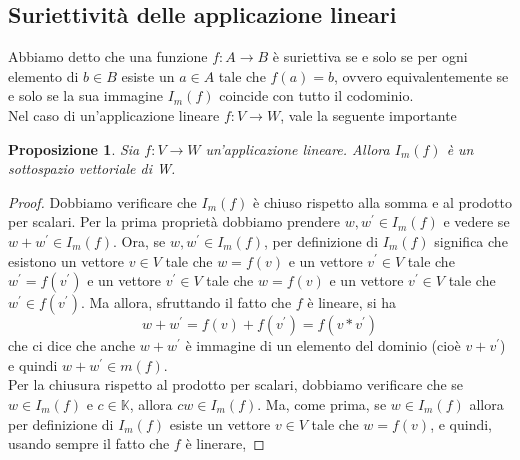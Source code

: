 \documentclass{book}
\newtheorem{proposizione}{Proposizione}
\begin{document}
\subsection{Suriettività delle applicazione lineari}
Abbiamo detto che una funzione $f: A\to B$ è suriettiva se e solo se per ogni elemento di
$b\in B$ esiste un $a\in A$ tale che $f(a)=b$, ovvero equivalentemente se e solo se la sua
immagine $I_m(f)$ coincide con tutto il codominio.\\
Nel caso di un'applicazione lineare $f:V\to W$, vale la seguente importante
\begin{proposizione}
  Sia $f: V\to W$ un'applicazione lineare. Allora $I_m(f)$ è un sottospazio vettoriale di W.
\end{proposizione}
\begin{proof}
  Dobbiamo verificare che $I_m(f)$ è chiuso rispetto alla somma e al prodotto per scalari. Per la
  prima proprietà dobbiamo prendere $w,w^\prime\in I_m(f)$ e vedere se $w+w^\prime\in I_m(f)$. Ora,
  se $w,w^\prime\in I_m(f)$, per definizione di $I_m(f)$ significa che esistono un vettore
  $v\in V$ tale che $w=f(v)$ e un vettore $v^\prime\in V$ tale che $w^\prime=f(v^\prime)$ e un
  vettore $v^\prime\in V$ tale che $w=f(v)$ e un vettore $v^\prime \in V$ tale che
  $w^\prime\in f(v^\prime)$. Ma allora, sfruttando il fatto che $f$ è lineare, si ha
  \begin{equation*}
    w+w^\prime=f(v)+f(v^\prime)=f(v*v^\prime)
  \end{equation*}
  che ci dice che anche $w+w^\prime$ è immagine di un elemento del dominio (cioè $v+v^\prime$) e
  quindi $w+w^\prime\in m(f)$.\\
  Per la chiusura rispetto al prodotto per scalari, dobbiamo verificare che se $w\in I_m(f)$ e
  $c\in\mathds{K}$, allora $cw\in I_m(f)$. Ma, come prima, se $w\in I_m(f)$ allora per
  definizione di $I_m(f)$ esiste un vettore $v\in V$ tale che $w=f(v)$, e quindi, usando sempre
  il fatto che $f$ è linerare,
  
\end{proof}
\end{document}
